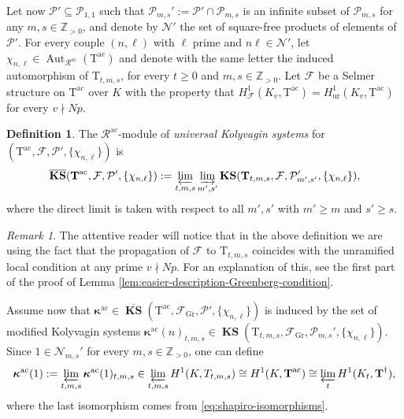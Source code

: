 \documentclass[12pt,reqno]{amsart}
\theoremstyle{definition}
\newtheorem{definition}[theorem]{Definition}
\theoremstyle{remark}
\newtheorem{remark}[theorem]{Remark}
\newcommand{\numberset}{\mathbb}
\newcommand{\Z}{\numberset{Z}}
\newcommand{\T}{\boldsymbol{\mathrm{T}}}
\newcommand{\calR}{\mathcal{R}}
\DeclareMathOperator{\Aut}{Aut}
\DeclareMathOperator{\ks}{KS}
\newcommand{\KS}{\boldsymbol{\ks}}
\newcommand{\ac}{\mathrm{ac}}
\newcommand{\Gr}{\mathrm{Gr}}
\newcommand{\ur}{\mathrm{ur}}
\newcommand{\gk}{\kappa}
\begin{document}
Let now $\mathcal{P}'\subseteq \mathcal{P}_{1,1}$ such that $\mathcal{P}_{m,s}':=\mathcal{P}'\cap\mathcal{P}_{m,s}$ is an infinite subset of $\mathcal{P}_{m,s}$ for any $m,s\in\Z_{>0}$, and denote by $\mathcal{N}'$ the set of square-free products of elements of $\mathcal{P}'$. For every couple $(n,\ell)$ with $\ell$ prime and $n\ell\in\mathcal{N}'$, let $\chi_{n,\ell}\in\Aut_{\calR^{\ac}}(\T^{\ac})$ and denote with the same letter the induced automorphism of $\T_{t,m,s}$, for every $t\ge 0$ and $m,s\in\Z_{>0}$. Let $\mathcal{F}$ be a Selmer structure on $\T^\ac$ over $K$ with the property that $H^1_{\mathcal{F}}(K_v,\T^\ac)=H^1_{\ur}(K_v,\T^\ac)$ for every $v\nmid Np$. 

\begin{definition}
    The $\mathcal{R}^{\ac}$-module of \emph{universal Kolyvagin systems} for $(\T^{\ac},\mathcal{F},\mathcal{P}', \{\chi_{n,\ell}\})$ is
    \begin{equation*}
            \overline{\KS}(\T^{\ac},\mathcal{F},\mathcal{P}', \{\chi_{n,\ell}\}):=\varprojlim_{t,m,s}\varinjlim_{m',s'} \KS(\T_{t,m,s},\mathcal{F},\mathcal{P}_{m',s'}', \{\chi_{n,\ell}\}),
        \end{equation*}
    where the direct limit is taken with respect to all $m',s'$ with $m'\ge m$ and $s'\ge s$.
\end{definition}

\begin{remark}
    The attentive reader will notice that in the above definition we are using the fact that the propagation of $\mathcal{F}$ to $\T_{t,m,s}$ coincides with the unramified local condition at any prime $v\nmid Np$. For an explanation of this, see the first part of the proof of Lemma \ref{lem:easier-description-Greenberg-condition}.
\end{remark}

Assume now that $\boldsymbol{\gk}^{\ac}\in \overline{\KS}(\T^{\ac},\mathcal{F}_{\Gr},\mathcal{P}',\{\chi_{n,\ell}\})$ is induced by the set of modified Kolyvagin systems $\boldsymbol{\gk}^{\ac}(n)_{t,m,s}\in \KS(\T_{t,m,s},\mathcal{F}_{\Gr},\mathcal{P}_{m,s}',\{\chi_{n,\ell}\})$. Since $1\in\mathcal{N}_{m,s}'$ for every $m,s\in\Z_{>0}$, one can define
\begin{equation*}
    \boldsymbol{\gk}^{\ac}(1):=\varprojlim_{t,m,s} \boldsymbol{\gk}^{\ac}(1)_{t,m,s}\in \varprojlim_{t,m,s} H^1(K,T_{t,m,s})\cong H^1(K,\T^{\ac})\cong\varprojlim_t H^1(K_t,\T^{\dag}),
\end{equation*}
where the last isomorphism comes from \eqref{eq:shapiro-isomorphisms}.
\end{document}
